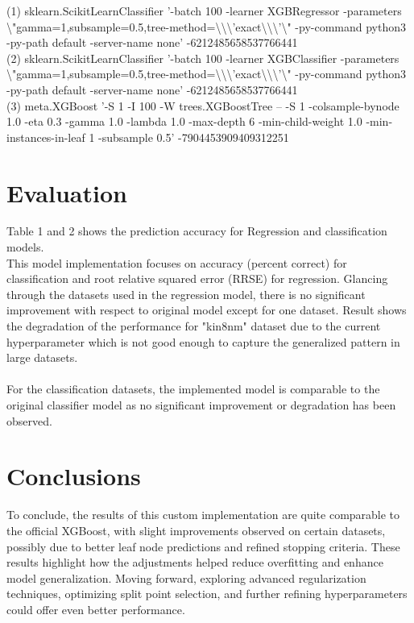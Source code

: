 \documentclass{article}
\begin{document}
\begin{table}[H]

\scriptsize
{
(1) sklearn.ScikitLearnClassifier '-batch 100 -learner XGBRegressor -parameters \textbackslash{}"gamma=1,subsample=0.5,tree-method=\textbackslash{}\textbackslash{}\textbackslash{}'exact\textbackslash{}\textbackslash{}\textbackslash{}'\textbackslash{}" -py-command python3 -py-path default -server-name none' -6212485658537766441 \\
(2) sklearn.ScikitLearnClassifier '-batch 100 -learner XGBClassifier -parameters \textbackslash{}"gamma=1,subsample=0.5,tree-method=\textbackslash{}\textbackslash{}\textbackslash{}'exact\textbackslash{}\textbackslash{}\textbackslash{}'\textbackslash{}" -py-command python3 -py-path default -server-name none' -6212485658537766441 \\
(3) meta.XGBoost '-S 1 -I 100 -W trees.XGBoostTree -- -S 1 -colsample-bynode 1.0 -eta 0.3 -gamma 1.0 -lambda 1.0 -max-depth 6 -min-child-weight 1.0 -min-instances-in-leaf 1 -subsample 0.5' -7904453909409312251 \\
}

\end{table}

\section{Evaluation}
Table 1 and 2 shows the prediction accuracy for Regression and classification models. \\
This model implementation focuses on accuracy (percent correct) for classification and root relative squared error (RRSE) for regression. Glancing through the datasets used in the regression model, there is no significant improvement with respect to original model except for one dataset. Result shows the degradation of the performance for "kin8nm" dataset due to the current hyperparameter which is not good enough to capture the generalized pattern in large datasets.  \\
\\
For the classification datasets, the implemented model is comparable to the original classifier model as no significant improvement or degradation has been observed.
\section{Conclusions}
To conclude, the results of this custom implementation are quite comparable to the official XGBoost, with slight improvements observed on certain datasets, possibly due to better leaf node predictions and refined stopping criteria. These results highlight how the adjustments helped reduce overfitting and enhance model generalization. Moving forward, exploring advanced regularization techniques, optimizing split point selection, and further refining hyperparameters could offer even better performance.





\end{document}
